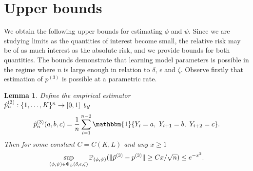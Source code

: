 \documentclass[journal]{IEEEtran}
\newtheorem{lemma}{Lemma}
\newcommand{\1}{\boldsymbol{1}}
\newcommand{\PP}{\mathbb{P}}
\DeclarePairedDelimiter{\braces}{\{}{\}}
\DeclarePairedDelimiter{\norm}{\lVert}{\rVert}
\newcommand{\II}{\mathbbm{1}}
\begin{document}
	\section{Upper bounds}\label{sec:upper-bounds}
	We obtain the following upper bounds for estimating $\phi$ and $\psi$. Since we are studying limits as the quantities of interest become small, the relative risk may be of as much interest as the absolute risk, and we provide bounds for both quantities. The bounds demonstrate that learning model parameters is possible in the regime where $n$ is large enough in relation to $\delta$, $\epsilon$ and $\zeta$. Observe firstly that estimation of $p^{(3)}$ is possible at a parametric rate.

	\begin{lemma}\label{lem:estimation-of-p3}
		Define the empirical estimator \\  $\hat{p}^{(3)}_n : \braces{1,\dots,K}^n\to [0,1]$ by \begin{equation}\label{eqn:def:hatp}
		\hat{p}^{(3)}_n(a,b,c)= \frac{1}{n} \sum_{i=1}^{n-2} \II\braces{Y_i=a,~Y_{i+1}=b,~Y_{i+2}=c}.\end{equation} Then for some constant $C=C(K,L)$ and any $x\geq 1$
		\[ \sup_{(\phi,\psi)\in \Phi_L(\delta,\epsilon,\zeta)} \PP_{(\phi,\psi)}(\norm{\hat{p}^{(3)}-p^{(3)}}\geq Cx/\sqrt{n})\leq e^{-x^2}.\]
	\end{lemma}
\end{document}
